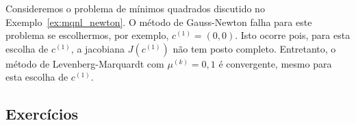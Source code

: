 \begin{ex}\label{ex:mqnl_LM}
  Consideremos o problema de mínimos quadrados discutido no Exemplo~\ref{ex:mqnl_newton}. O método de Gauss-Newton falha para este problema se escolhermos, por exemplo, $c^{(1)} = (0, 0)$. Isto ocorre pois, para esta escolha de $c^{(1)}$, a jacobiana $J(c^{(1)})$ não tem posto completo. Entretanto, o método de Levenberg-Marquardt com $\mu^{(k)} = 0,1$ é convergente, mesmo para esta escolha de $c^{(1)}$.







\end{ex}

\subsection{Exercícios}
\badgeRevisar

